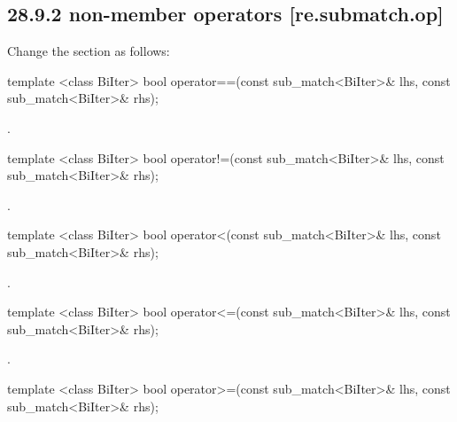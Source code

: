\documentclass[ebook,11pt,article]{memoir}
\begin{document}
\subsection{28.9.2  non-member operators [re.submatch.op]}
Change the section as follows:

\begin{itemdecl}
template <class BiIter>
  bool operator==(const sub_match<BiIter>& lhs, const sub_match<BiIter>& rhs); 
\end{itemdecl}

\begin{itemdescr}
\pnum\returns  {}.
\end{itemdescr}

\begin{itemdecl}
template <class BiIter>
  bool operator!=(const sub_match<BiIter>& lhs, const sub_match<BiIter>& rhs); 
\end{itemdecl}

\begin{itemdescr}
\pnum\returns {}.
\end{itemdescr}

\begin{itemdecl}
template <class BiIter>
  bool operator<(const sub_match<BiIter>& lhs, const sub_match<BiIter>& rhs); 
\end{itemdecl}

\begin{itemdescr}
\pnum\returns  {}.
\end{itemdescr}

\begin{itemdecl}
template <class BiIter>
  bool operator<=(const sub_match<BiIter>& lhs, const sub_match<BiIter>& rhs); 
\end{itemdecl}

\begin{itemdescr}
\pnum\returns  {}.
\end{itemdescr}

\begin{itemdecl}
template <class BiIter>
  bool operator>=(const sub_match<BiIter>& lhs, const sub_match<BiIter>& rhs); 
\end{itemdecl}
\end{document}
